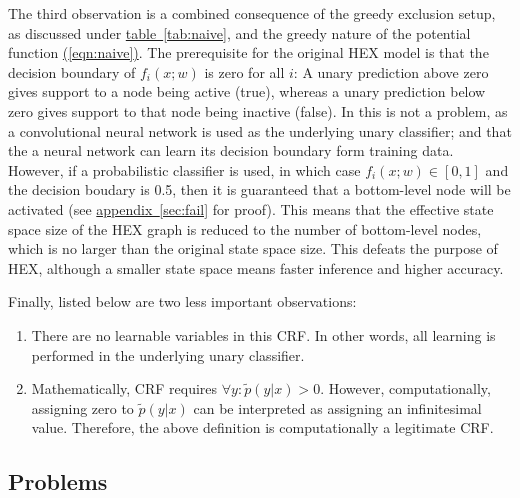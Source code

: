 \documentclass[11pt,a4paper]{article}
\begin{document}
The third observation is a combined consequence of the greedy exclusion setup, as discussed under \hyperref[tab:naive]{table~\ref{tab:naive}}, and the greedy nature of the potential function \hyperref[eqn:naive]{(\ref{eqn:naive})}. The prerequisite for the original HEX model is that the decision boundary of $f_i(x;w)$ is zero for all $i$: A unary prediction above zero gives support to a node being active (true), whereas a unary prediction below zero gives support to that node being inactive (false). In \cite{deng2014large} this is not a problem, as a convolutional neural network \cite{krizhevsky2012imagenet} is used as the underlying unary classifier; and that the a neural network can learn its decision boundary form training data. However, if a probabilistic classifier is used, in which case $f_i(x;w)\in[0,1]$ and the decision boudary is 0.5, then it is guaranteed that a bottom-level node will be activated (see \hyperref[sec:fail]{appendix~\ref{sec:fail}} for proof). This means that the effective state space size of the HEX graph is reduced to the number of bottom-level nodes, which is no larger than the original state space size. This defeats the purpose of HEX, although a smaller state space means faster inference and higher accuracy.

Finally, listed below are two less important observations:
\begin{enumerate}
\item There are no learnable variables in this CRF. In other words, all learning is performed in the underlying unary classifier.
\item Mathematically, CRF requires $\forall y:\tilde{p}(y|x)>0$. However, computationally, assigning zero to $\tilde{p}(y|x)$ can be interpreted as assigning an infinitesimal value. Therefore, the above definition is computationally a legitimate CRF.
\end{enumerate}

\subsection{Problems}
\label{sec:problem}
\end{document}
